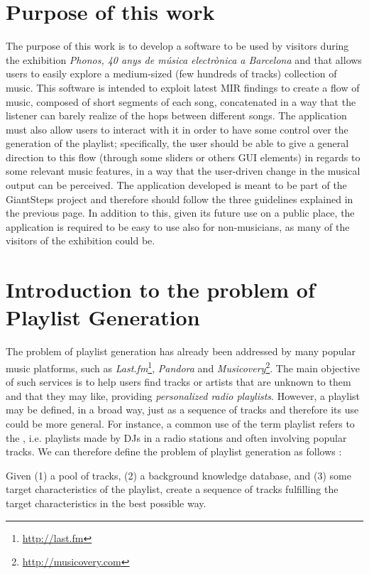 \section{Purpose of this work}
The purpose of this work is to develop a software to be used by visitors during the exhibition \textit{Phonos, 40 anys de música electrònica a Barcelona} and that allows users to easily explore a medium-sized (few hundreds of tracks) collection of music. This software is intended to exploit latest MIR findings to create a flow of music, composed of short segments of each song, concatenated in a way that the listener can barely realize of the hops between different songs. The application must also allow users to interact with it in order to have some control over the generation of the playlist; specifically, the user should be able to give a general direction to this flow (through some sliders or others GUI elements) in regards to some relevant music features, in a way that the user-driven change in the musical output can be perceived. The application developed is meant to be part of the GiantSteps project and therefore should follow the three guidelines explained in the previous page. In addition to this, given its future use on a public place, the application is required to be easy to use also for non-musicians, as many of the visitors of the exhibition could be.

\section{Introduction to the problem of Playlist Generation}
The problem of playlist generation has already been addressed by many popular music platforms, such as \textit{Last.fm}\footnote{\url{http://last.fm}}, \textit{Pandora} and \textit{Musicovery}\footnote{\url{http://musicovery.com}}. The main objective of such services is to help users find tracks or artists that are unknown to them and that they may like, providing \textit{personalized radio playlists}. However, a playlist may be defined, in a broad way, just as a sequence of tracks \cite{bonnin14} and therefore its use could be more general. For instance, a common use of the term playlist refers to the , i.e. playlists made by DJs in a radio stations and often involving popular tracks. We can therefore define the problem of playlist generation as follows \cite{bonnin14}:

\begin{displayquote}
Given (1) a pool of tracks, (2) a background knowledge database, and (3) some target characteristics of the playlist, create a sequence of tracks fulfilling the target characteristics in the best possible way.
\end{displayquote}

